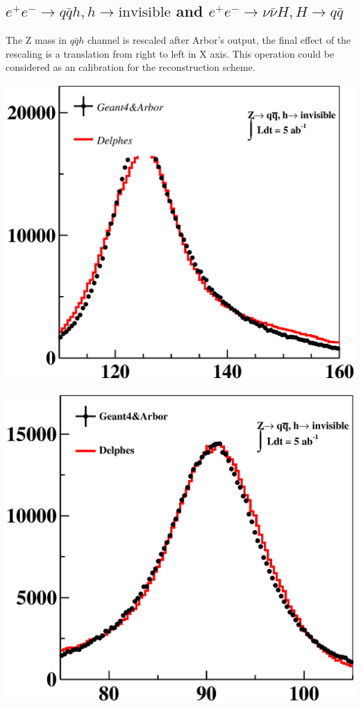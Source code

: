 \documentclass[a4paper,10pt,twoside]{cpc-hepnp}
\begin{document}
\subsection{$e^+e^-\to q\bar{q}h, h \to\mbox{invisible}$ and $e^+e^-\to \nu\bar{\nu}H, H\to q\bar{q}$}
The Z mass in $q\bar{q}h$ channel is rescaled after Arbor's output, the final effect of the rescaling is a translation from right to left in X axis. This operation could be considered as an calibration for the reconstruction scheme. 


\begin{center}
\includegraphics[width=0.9\linewidth]{qqh_reco}
\end{center}
\begin{center}
\includegraphics[width=0.9\linewidth]{qqh_mass}
\end{center}
\end{document}
